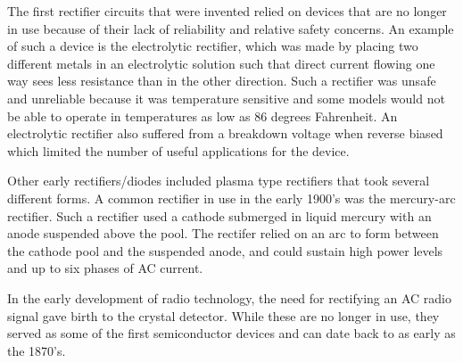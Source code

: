 
The first rectifier circuits that were invented relied
on devices that are no longer in use because of their
lack of reliability and relative safety concerns. An
example of such a device is the electrolytic rectifier,
which was made by placing two different metals in an
electrolytic solution such that direct current flowing
one way sees less resistance than in the other direction.
Such a rectifier was unsafe and unreliable because it
was temperature sensitive and some models would not
be able to operate in temperatures as low as 86 degrees
Fahrenheit. An electrolytic rectifier also suffered 
from a breakdown voltage when reverse biased which
limited the number of useful applications for the device.

Other early rectifiers/diodes included plasma type rectifiers
that took several different forms. A common rectifier
in use in the early 1900's was the mercury-arc rectifier.
Such a rectifier used a cathode submerged in liquid
mercury with an anode suspended above the pool. The
rectifer relied on an arc to form between the cathode
pool and the suspended anode, and could sustain high
power levels and up to six phases of AC current.

In the early development of radio technology, the need
for rectifying an AC radio signal gave birth to the
crystal detector. While these are no longer in use,
they served as some of the first semiconductor devices
and can date back to as early as the 1870's.
